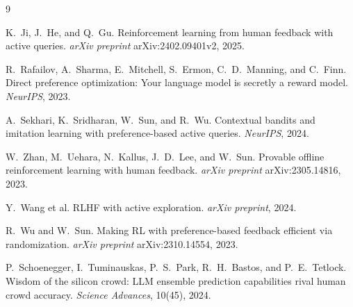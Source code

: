 \documentclass[11pt]{article}
\begin{document}

\begin{thebibliography}{9}

K.~Ji, J.~He, and Q.~Gu.
\newblock Reinforcement learning from human feedback with active queries.
\newblock \emph{arXiv preprint} arXiv:2402.09401v2, 2025.

R.~Rafailov, A.~Sharma, E.~Mitchell, S.~Ermon, C.~D.~Manning, and C.~Finn.
\newblock Direct preference optimization: Your language model is secretly a reward model.
\newblock \emph{NeurIPS}, 2023.

A.~Sekhari, K.~Sridharan, W.~Sun, and R.~Wu.
\newblock Contextual bandits and imitation learning with preference-based active queries.
\newblock \emph{NeurIPS}, 2024.

W.~Zhan, M.~Uehara, N.~Kallus, J.~D.~Lee, and W.~Sun.
\newblock Provable offline reinforcement learning with human feedback.
\newblock \emph{arXiv preprint} arXiv:2305.14816, 2023.

Y.~Wang et al.
\newblock RLHF with active exploration.
\newblock \emph{arXiv preprint}, 2024.

R.~Wu and W.~Sun.
\newblock Making RL with preference-based feedback efficient via randomization.
\newblock \emph{arXiv preprint} arXiv:2310.14554, 2023.

P.~Schoenegger, I.~Tuminauskas, P.~S.~Park, R.~H.~Bastos, and P.~E.~Tetlock.
\newblock Wisdom of the silicon crowd: LLM ensemble prediction capabilities rival human crowd accuracy.
\newblock \emph{Science Advances}, 10(45), 2024.

\end{thebibliography}
\end{document}
